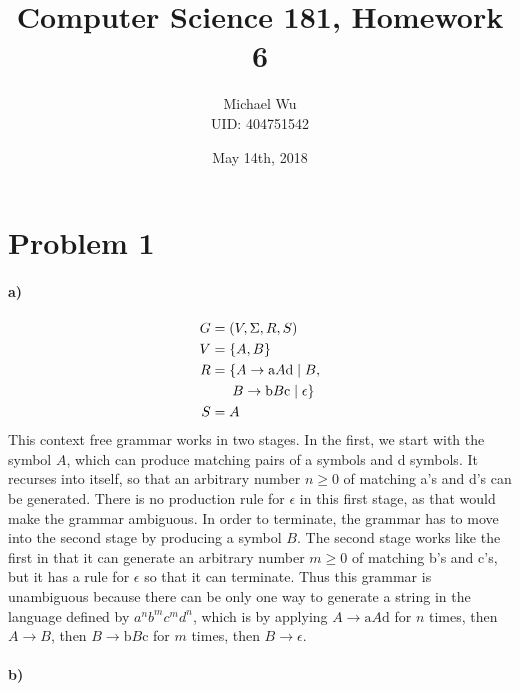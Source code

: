\documentclass[12pt]{article}
\begin{document}
\title{Computer Science 181, Homework 6}
\date{May 14th, 2018}
\author{Michael Wu\\UID: 404751542}
\maketitle

\section*{Problem 1}

\paragraph{a)}

\begin{align*}
        G&=(V,\Sigma,R,S)\\
        V&=\{A,B\}\\
        R&=\{A\rightarrow \text{a}A\text{d} \mid B,\\
        &\hphantom{==}B\rightarrow \text{b}B\text{c} \mid \epsilon\}\\
        S&=A
\end{align*}
This context free grammar works in two stages. In the first, we start with the symbol \(A\), which can produce matching pairs of a symbols and d symbols.
It recurses into itself, so that an arbitrary number \(n\geq0\) of matching a's and d's can be generated. There is no production rule for \(\epsilon\) in this first
stage, as that would make the grammar ambiguous. In order to terminate, the grammar has to move into the second stage by producing a symbol \(B\). The second stage
works like the first in that it can generate an arbitrary number \(m\geq0\) of matching b's and c's, but it has a rule for \(\epsilon\) so that it can terminate.
Thus this grammar is unambiguous because there can be only one way to generate a string in the language defined by \(a^nb^mc^md^n\), which is by applying
\(A\rightarrow \text{a}A\text{d}\) for \(n\) times, then \(A\rightarrow B\), then \(B\rightarrow \text{b}B\text{c}\) for \(m\) times, then \(B\rightarrow \epsilon\).

\paragraph{b)}
\end{document}
